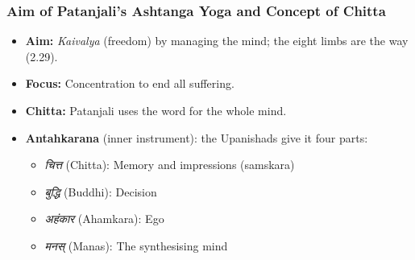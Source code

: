 

\begin{frame}[fragile]\frametitle{Aim of Patanjali’s Ashtanga Yoga and Concept of Chitta}

    \begin{itemize}
        \item \textbf{Aim:} \textit{Kaivalya} (freedom) by managing the mind; the eight limbs are the way (2.29).
        \item \textbf{Focus:} Concentration to end all suffering.
        \item \textbf{Chitta:} Patanjali uses the word for the whole mind.
        \item \textbf{Antahkarana} (inner instrument): the Upanishads give it four parts:
        \begin{itemize}
            \item \textit{चित्त} (Chitta): Memory and impressions (samskara)
            \item \textit{बुद्धि} (Buddhi): Decision
            \item \textit{अहंकार} (Ahamkara): Ego
            \item \textit{मनस्} (Manas): The synthesising mind
        \end{itemize}
    \end{itemize}

\end{frame}

